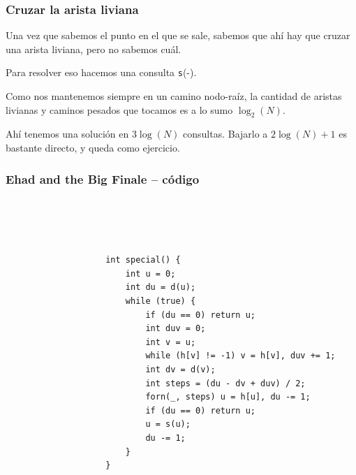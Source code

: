 \begin{frame}
  \frametitle{Cruzar la arista liviana}

  Una vez que sabemos el punto en el que se sale, sabemos que ahí hay que cruzar una arista liviana, pero no sabemos cuál.

  \vspace{0.75em}

  Para resolver eso hacemos una consulta \texttt{s}(-).

  \vspace{0.75em}

  Como nos mantenemos siempre en un camino nodo-raíz, la cantidad de aristas livianas y caminos pesados que tocamos es a lo sumo \(\log_2(N)\).

  \vspace{0.75em}

  Ahí tenemos una solución en \(3\log(N)\) consultas. Bajarlo a \(2\log(N)+1\) es bastante directo, y queda como ejercicio.
\end{frame}

\begin{frame}[fragile,shrink=5]
  \frametitle{Ehad and the Big Finale -- código}

\begin{lstlisting}[basicstyle=\ttfamily\scriptsize]




                    int special() {
                        int u = 0;
                        int du = d(u);
                        while (true) {
                            if (du == 0) return u;
                            int duv = 0;
                            int v = u;
                            while (h[v] != -1) v = h[v], duv += 1;
                            int dv = d(v);
                            int steps = (du - dv + duv) / 2;
                            forn(_, steps) u = h[u], du -= 1;
                            if (du == 0) return u;
                            u = s(u);
                            du -= 1;
                        }
                    }
\end{lstlisting}
\end{frame}
